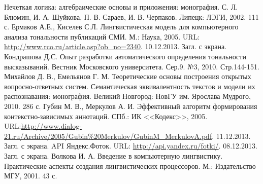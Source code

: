 \documentclass[a4paper,14pt,russian]{extreport}
\begin{document}
\newpage

\begin{thebibliography}{0}
 Нечеткая логика: алгебраические основы и приложения: монография. С. Л. Блюмин, И. А. Шуйкова, П. В. Сараев, И. В. Черпаков. Липецк: ЛЭГИ, 2002. 111 с.
 Ермаков А.Е., Киселев С.Л. Лингвистическая модель для компьютерного анализа тональности публикаций СМИ. М.: Наука, 2005. URL: \url{http://www.rco.ru/article.asp?ob_no=2340}. 10.12.2013. Загл. с экрана.
 Кондрашова Д.С. Опыт разработки автоматического определения тональности высказываний. Вестник Московского университета. Сер.9. №3, 2010. Стр.144-151.
 Михайлов Д. В., Емельянов Г. М. Теоретические основы построения открытых вопросно-ответных систем. Семантическая эквивалентность текстов и модели их распознавания: монография. Великий Новгород: НовГУ им. Ярослава Мудрого, 2010. 286 с.
 Губин М. В., Меркулов А. И. Эффективный алгоритм формирования контекстно-зависимых аннотаций. СПб.: ИК <<Кодекс>>, 2005. URL:\url{http://www.dialog-21.ru/Archive/2005/Gubin%20Merkulov/GubinM_MerkulovA.pdf}. 11.12.2013. Загл. с экрана.
 API Яндекс.Фоток. URL: \url{http://api.yandex.ru/fotki/}. 08.12.2013. Загл. с экрана.
 Волкова И. А. Введение в компьютерную лингвистику. Практические аспекты создания лингвистических процессоров. М.: Издательство МГУ, 2001. 43 с.
\end{thebibliography}
\end{document}
